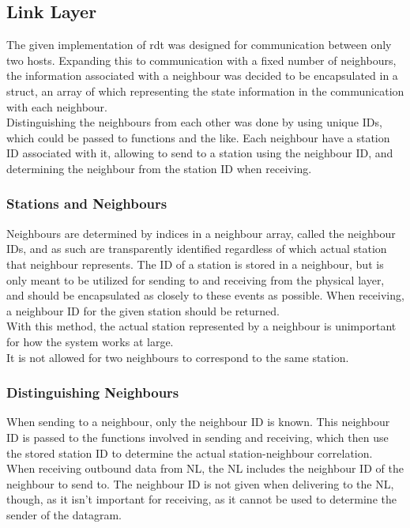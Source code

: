 \subsection{Link Layer}
The given implementation of rdt was designed for communication between only two hosts. Expanding this to communication with a fixed number of neighbours, the information associated with a neighbour was decided to be encapsulated in a struct, an array of which representing the state information in the communication with each neighbour.\\
Distinguishing the neighbours from each other was done by using unique IDs, which could be passed to functions and the like. Each neighbour have a station ID associated with it, allowing to send to a station using the neighbour ID, and determining the neighbour from the station ID when receiving.

\subsubsection{Stations and Neighbours}
Neighbours are determined by indices in a neighbour array, called the neighbour IDs, and as such are transparently identified regardless of which actual station that neighbour represents. The ID of a station is stored in a neighbour, but is only meant to be utilized for sending to and receiving from the physical layer, and should be encapsulated as closely to these events as possible. When receiving, a neighbour ID for the given station should be returned.\\
With this method, the actual station represented by a neighbour is unimportant for how the system works at large.\\
It is not allowed for two neighbours to correspond to the same station.

%

\subsubsection{Distinguishing Neighbours}
When sending to a neighbour, only the neighbour ID is known. This neighbour ID is passed to the functions involved in sending and receiving, which then use the stored station ID to determine the actual station-neighbour correlation.\\
When receiving outbound data from NL, the NL includes the neighbour ID of the neighbour to send to. The neighbour ID is not given when delivering to the NL, though, as it isn't important for receiving, as it cannot be used to determine the sender of the datagram.

